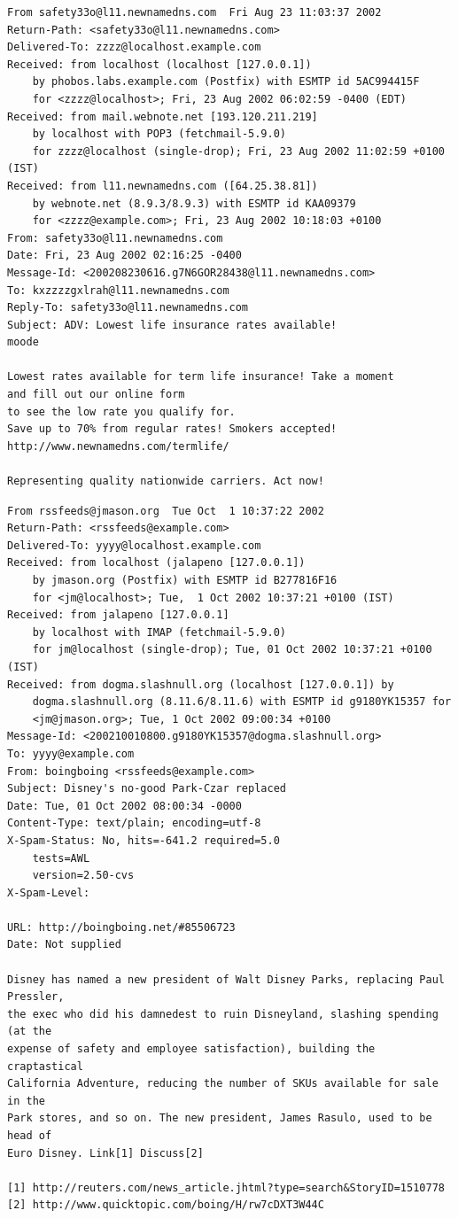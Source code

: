 \documentclass[
]{krantz}
\begin{document}
\begin{verbatim}
From safety33o@l11.newnamedns.com  Fri Aug 23 11:03:37 2002
Return-Path: <safety33o@l11.newnamedns.com>
Delivered-To: zzzz@localhost.example.com
Received: from localhost (localhost [127.0.0.1])
	by phobos.labs.example.com (Postfix) with ESMTP id 5AC994415F
	for <zzzz@localhost>; Fri, 23 Aug 2002 06:02:59 -0400 (EDT)
Received: from mail.webnote.net [193.120.211.219]
	by localhost with POP3 (fetchmail-5.9.0)
	for zzzz@localhost (single-drop); Fri, 23 Aug 2002 11:02:59 +0100 (IST)
Received: from l11.newnamedns.com ([64.25.38.81])
	by webnote.net (8.9.3/8.9.3) with ESMTP id KAA09379
	for <zzzz@example.com>; Fri, 23 Aug 2002 10:18:03 +0100
From: safety33o@l11.newnamedns.com
Date: Fri, 23 Aug 2002 02:16:25 -0400
Message-Id: <200208230616.g7N6GOR28438@l11.newnamedns.com>
To: kxzzzzgxlrah@l11.newnamedns.com
Reply-To: safety33o@l11.newnamedns.com
Subject: ADV: Lowest life insurance rates available!                                                   
moode

Lowest rates available for term life insurance! Take a moment 
and fill out our online form 
to see the low rate you qualify for. 
Save up to 70% from regular rates! Smokers accepted! 
http://www.newnamedns.com/termlife/ 
          
Representing quality nationwide carriers. Act now!
\end{verbatim}

\begin{verbatim}
From rssfeeds@jmason.org  Tue Oct  1 10:37:22 2002
Return-Path: <rssfeeds@example.com>
Delivered-To: yyyy@localhost.example.com
Received: from localhost (jalapeno [127.0.0.1])
	by jmason.org (Postfix) with ESMTP id B277816F16
	for <jm@localhost>; Tue,  1 Oct 2002 10:37:21 +0100 (IST)
Received: from jalapeno [127.0.0.1]
	by localhost with IMAP (fetchmail-5.9.0)
	for jm@localhost (single-drop); Tue, 01 Oct 2002 10:37:21 +0100 (IST)
Received: from dogma.slashnull.org (localhost [127.0.0.1]) by
    dogma.slashnull.org (8.11.6/8.11.6) with ESMTP id g9180YK15357 for
    <jm@jmason.org>; Tue, 1 Oct 2002 09:00:34 +0100
Message-Id: <200210010800.g9180YK15357@dogma.slashnull.org>
To: yyyy@example.com
From: boingboing <rssfeeds@example.com>
Subject: Disney's no-good Park-Czar replaced
Date: Tue, 01 Oct 2002 08:00:34 -0000
Content-Type: text/plain; encoding=utf-8
X-Spam-Status: No, hits=-641.2 required=5.0
	tests=AWL
	version=2.50-cvs
X-Spam-Level: 

URL: http://boingboing.net/#85506723
Date: Not supplied

Disney has named a new president of Walt Disney Parks, replacing Paul Pressler, 
the exec who did his damnedest to ruin Disneyland, slashing spending (at the 
expense of safety and employee satisfaction), building the craptastical 
California Adventure, reducing the number of SKUs available for sale in the 
Park stores, and so on. The new president, James Rasulo, used to be head of 
Euro Disney. Link[1] Discuss[2]

[1] http://reuters.com/news_article.jhtml?type=search&StoryID=1510778
[2] http://www.quicktopic.com/boing/H/rw7cDXT3W44C
\end{verbatim}
\end{document}
